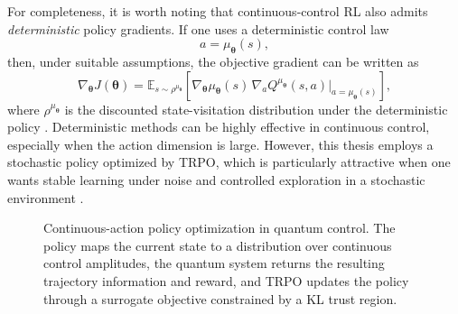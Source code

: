 For completeness, it is worth noting that continuous-control RL also admits \emph{deterministic} policy gradients. If one uses a deterministic control law
\begin{equation}
a=\mu_{\bm{\theta}}(s),
\label{eq:deterministic_policy}
\end{equation}
then, under suitable assumptions, the objective gradient can be written as
\begin{equation}
\nabla_{\bm{\theta}} J(\bm{\theta})
=
\mathbb{E}_{s\sim\rho^{\mu_{\bm{\theta}}}}
\left[
\nabla_{\bm{\theta}}\mu_{\bm{\theta}}(s)\,
\nabla_{a}Q^{\mu_{\bm{\theta}}}(s,a)
\big|_{a=\mu_{\bm{\theta}}(s)}
\right],
\label{eq:deterministic_policy_gradient}
\end{equation}
where $\rho^{\mu_{\bm{\theta}}}$ is the discounted state-visitation distribution under the deterministic policy \cite{Silver2014}. Deterministic methods can be highly effective in continuous control, especially when the action dimension is large. However, this thesis employs a stochastic policy optimized by TRPO, which is particularly attractive when one wants stable learning under noise and controlled exploration in a stochastic environment \cite{Schulman2015}.

\tikzexternaldisable
\begin{figure}[t]
\centering
{}
\caption{Continuous-action policy optimization in quantum control. The policy maps the current state to a distribution over continuous control amplitudes, the quantum system returns the resulting trajectory information and reward, and TRPO updates the policy through a surrogate objective constrained by a KL trust region.
}
\label{fig:continuous_action_trpo}
\end{figure}
\tikzexternalenable

